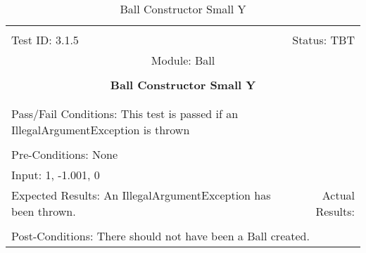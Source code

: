 \documentclass[titlepage]{article}
\begin{document}
\begin{center}%
\begin{table}
\begin{tabular}{|l r|}\hline&\\[-2mm]
	Test ID: 3.1.5	&Status: TBT\\[-3mm]
	\multicolumn{2}{|c|}{Module: Ball}\\&\\
	\multicolumn{2}{|c|}{\textbf{\large{Ball Constructor Small Y}}}\\&\\\hline&\\[-3mm]
	\multicolumn{2}{|p{\textwidth}|}{Pass/Fail Conditions: This test is passed if an IllegalArgumentException is thrown}\\[1mm]\hline&\\[-3mm]
	\multicolumn{2}{|p{\textwidth}|}{Pre-Conditions: None}\\[4mm]
	\multicolumn{2}{|p{\textwidth}|}{Input: 1, -1.001, 0}\\[2mm]\hline
	\multicolumn{1}{|p{0.49\textwidth}}{Expected Results: An IllegalArgumentException has been thrown.}	&\multicolumn{1}{|p{0.45\textwidth}|}{Actual Results:}\\\hline&\\[-3mm]
	\multicolumn{2}{|p{\textwidth}|}{Post-Conditions: There should not have been a Ball created.}\\\hline
\end{tabular}
\caption{Ball Constructor Small Y}
\end{table}
\end{center}
\end{document}
